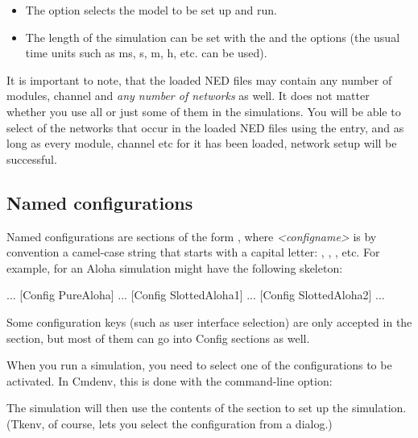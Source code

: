 \begin{itemize}
  \item{The  option selects the model to be set up and run.}
  \item{The length of the simulation can be set with the
     and the  options (the
    usual time units such as ms, s, m, h, etc. can be used).}
\end{itemize}

It is important to note, that the loaded NED files may contain
any number of modules, channel and \textit{any number of networks} as well.
It does not matter whether you use all or just some of them
in the simulations. You will be able to select  of the
networks that occur in the loaded NED files using the 
 entry, and as long as every module, channel etc
for it has been loaded, network setup will be successful.


\subsection{Named configurations}

Named configurations are sections of the form , where
\textit{<configname>} is by convention a camel-case string that starts with a capital letter:
, , , etc. For example,
 for an Aloha simulation might have the following skeleton:

\begin{inifile}
[General]
...
[Config PureAloha]
...
[Config SlottedAloha1]
...
[Config SlottedAloha2]
...
\end{inifile}

Some configuration keys (such as user interface selection) are only
accepted in the \ttt{[General]} section, but most of them can go into Config
sections as well.

When you run a simulation, you need to select one of the configurations
to be activated. In Cmdenv, this is done with the  command-line option:


The simulation will then use the contents of the 
section to set up the simulation. (Tkenv, of course, lets you select
the configuration from a dialog.)


